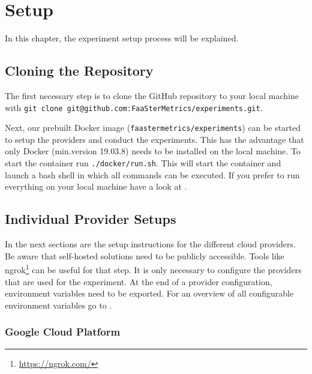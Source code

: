 \documentclass[../main.tex]{subfiles}
\begin{document}
\section{Setup}\label{sec:setup}
In this chapter, the experiment setup process will be explained.

\subsection{Cloning the Repository}\label{sec:clonesetup}

The first necessary step is to clone the GitHub repository to your local machine with 
\texttt{git clone git@github.com:FaaSterMetrics/experiments.git}. 

Next, our prebuilt Docker image (\texttt{faastermetrics/experiments}) can be started to setup the providers and conduct the experiments. 
This has the advantage that only Docker (min.\@ version 19.03.8) needs to be installed on the local machine. 
To start the container run \texttt{./docker/run.sh}. 
This will start the container and launch a bash shell in which all commands can be executed.
If you prefer to run everything on your local machine have a look at .

\subsection{Individual Provider Setups}\label{sec:providersetup}

In the next sections are the setup instructions for the different cloud providers. 
Be aware that self-hosted solutions need to be publicly accessible. 
Tools like ngrok\footnote{\url{https://ngrok.com/}} can be useful for that step.
It is only necessary to configure the providers that are used for the experiment.
At the end of a provider configuration, environment variables need to be exported.
For an overview of all configurable environment variables go to .


\subsubsection{Google Cloud Platform}\label{sec:providersetupgcp}
\end{document}
